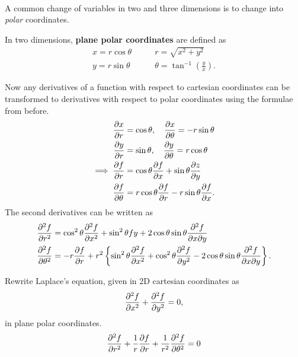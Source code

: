 \documentclass[../multivariate_calculus.tex]{subfiles}
\begin{document}
        \paragraph{}
        A common change of variables in two and three dimensions is to change into \textit{polar} coordinates.
        \begin{definition}
            In two dimensions, \textbf{plane polar coordinates} are defined as
            \begin{align}
                x=r\cos\theta\quad&\quad r=\sqrt{x^2+y^2}\\
                y=r\sin\theta\quad&\quad\theta=\tan^{-1}\left(\frac{y}{x}\right).
            \end{align}
        \end{definition}
        Now any derivatives of a function with respect to cartesian coordinates can be transformed to derivatives with respect to polar coordinates using the formulae from before.
        \begin{align}
            \pdv{x}{r}&=\cos\theta,\quad\pdv{x}{\theta}=-r\sin\theta\\
            \pdv{y}{r}&=\sin\theta,\quad\pdv{y}{\theta}=r\cos\theta\\
            \implies\pdv{f}{r}&=\cos\theta\pdv{f}{x}+\sin\theta\pdv{z}{y}\\
            \pdv{f}{\theta}&=r\cos\theta\pdv{f}{r}-r\sin\theta\pdv{f}{x}.
        \end{align}
        The second derivatives can be written as
        \begin{align}
            \pdv[2]{f}{r}&=\cos^2\theta\pdv[2]{f}{x}+\sin^2\theta{f}{y}+2\cos\theta\sin\theta\frac{\partial^2 f}{\partial x\partial y}\\
            \pdv[2]{f}{\theta}&=-r\pdv{f}{r}+r^2\left\{\sin^2\theta\pdv[2]{f}{x}+\cos^2\theta\pdv[2]{f}{y}-2\cos\theta\sin\theta\frac{\partial^2 f}{\partial x\partial y}\right\}.
        \end{align}
        \begin{example}
            Rewrite Laplace's equation, given in 2D cartesian coordinates as
            \begin{equation}
                \pdv[2]{f}{x}+\pdv[2]{f}{y}=0,
            \end{equation}
            in plane polar coordinates.
            \begin{equation}
                \pdv[2]{f}{r}+\frac{1}{r}\pdv{f}{r}+\frac{1}{r^2}\pdv[2]{f}{\theta}=0
            \end{equation}
        \end{example}
\end{document}
